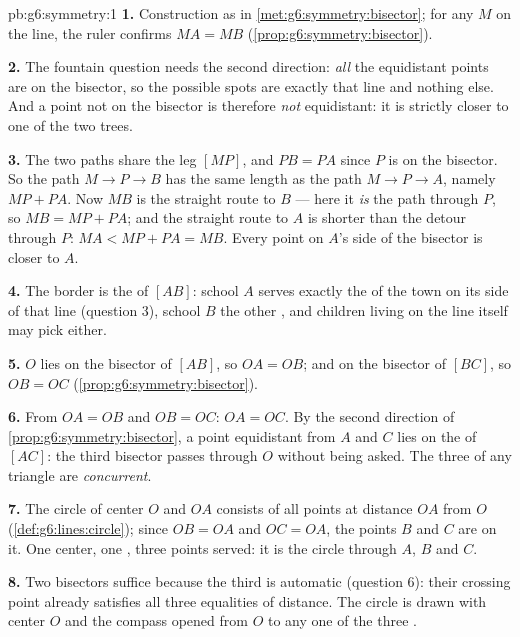 \begin{solution}{pb:g6:symmetry:1}
\textbf{1.} Construction as in \cref{met:g6:symmetry:bisector};
for any $M$ on the line, the ruler confirms $MA = MB$
(\cref{prop:g6:symmetry:bisector}).

\textbf{2.} The fountain question needs the second direction:
\emph{all} the equidistant points are on the bisector, so the
possible spots are exactly that line and nothing else. And a
point not on the bisector is therefore \emph{not} equidistant:
it is strictly closer to one of the two trees.

\textbf{3.} The two paths share the leg $[MP]$, and $PB = PA$
since $P$ is on the bisector. So the path $M \to P \to B$ has
the same length as the path $M \to P \to A$, namely $MP + PA$.
Now $MB$ is the straight route to $B$ --- here it \emph{is} the
path through $P$, so $MB = MP + PA$; and the straight route to
$A$ is shorter than the detour through $P$: $MA < MP + PA = MB$.
Every point on $A$'s side of the bisector is closer to $A$.

\textbf{4.} The border is the  of $[AB]$:
school $A$ serves exactly the  of the town on its side of
that line (question 3), school $B$ the other , and children
living on the line itself may pick either.

\textbf{5.} $O$ lies on the bisector of $[AB]$, so $OA = OB$;
and on the bisector of $[BC]$, so $OB = OC$
(\cref{prop:g6:symmetry:bisector}).

\textbf{6.} From $OA = OB$ and $OB = OC$: $OA = OC$. By the
second direction of \cref{prop:g6:symmetry:bisector}, a point
equidistant from $A$ and $C$ lies on the 
of $[AC]$: the third bisector passes through $O$ without being
asked. The three  of any triangle are
\emph{concurrent}.

\textbf{7.} The circle of center $O$ and  $OA$ consists of
all points at distance $OA$ from $O$
(\cref{def:g6:lines:circle}); since $OB = OA$ and $OC = OA$, the
points $B$ and $C$ are on it. One center, one , three
points served: it is the circle through $A$, $B$ and $C$.

\textbf{8.} Two bisectors suffice because the third is automatic
(question 6): their crossing point already satisfies all three
equalities of distance. The circle is drawn with center $O$ and
the compass opened from $O$ to any one of the three .


\end{solution}
